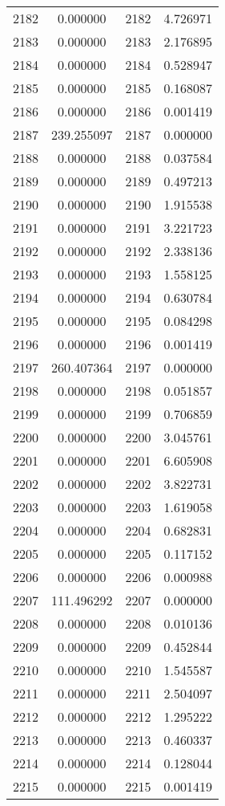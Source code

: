 \documentclass[12pt]{article}
\begin{document}
\begin{longtable}{@{}cccc@{}}
2182 & 0.000000 & 2182 & 4.726971 \\
2183 & 0.000000 & 2183 & 2.176895 \\
2184 & 0.000000 & 2184 & 0.528947 \\
2185 & 0.000000 & 2185 & 0.168087 \\
2186 & 0.000000 & 2186 & 0.001419 \\
2187 & 239.255097 & 2187 & 0.000000 \\
2188 & 0.000000 & 2188 & 0.037584 \\
2189 & 0.000000 & 2189 & 0.497213 \\
2190 & 0.000000 & 2190 & 1.915538 \\
2191 & 0.000000 & 2191 & 3.221723 \\
2192 & 0.000000 & 2192 & 2.338136 \\
2193 & 0.000000 & 2193 & 1.558125 \\
2194 & 0.000000 & 2194 & 0.630784 \\
2195 & 0.000000 & 2195 & 0.084298 \\
2196 & 0.000000 & 2196 & 0.001419 \\
2197 & 260.407364 & 2197 & 0.000000 \\
2198 & 0.000000 & 2198 & 0.051857 \\
2199 & 0.000000 & 2199 & 0.706859 \\
2200 & 0.000000 & 2200 & 3.045761 \\
2201 & 0.000000 & 2201 & 6.605908 \\
2202 & 0.000000 & 2202 & 3.822731 \\
2203 & 0.000000 & 2203 & 1.619058 \\
2204 & 0.000000 & 2204 & 0.682831 \\
2205 & 0.000000 & 2205 & 0.117152 \\
2206 & 0.000000 & 2206 & 0.000988 \\
2207 & 111.496292 & 2207 & 0.000000 \\
2208 & 0.000000 & 2208 & 0.010136 \\
2209 & 0.000000 & 2209 & 0.452844 \\
2210 & 0.000000 & 2210 & 1.545587 \\
2211 & 0.000000 & 2211 & 2.504097 \\
2212 & 0.000000 & 2212 & 1.295222 \\
2213 & 0.000000 & 2213 & 0.460337 \\
2214 & 0.000000 & 2214 & 0.128044 \\
2215 & 0.000000 & 2215 & 0.001419 \\

\end{longtable}
\end{document}
